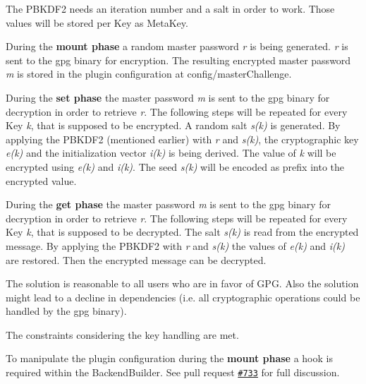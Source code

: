 The P\+B\+K\+D\+F2 needs an iteration number and a salt in order to work. Those values will be stored per Key as Meta\+Key.

During the {\bfseries mount phase} a random master password {\itshape r} is being generated. {\itshape r} is sent to the gpg binary for encryption. The resulting encrypted master password {\itshape m} is stored in the plugin configuration at {\ttfamily config/master\+Challenge}.

During the {\bfseries set phase} the master password {\itshape m} is sent to the gpg binary for decryption in order to retrieve {\itshape r}. The following steps will be repeated for every Key {\itshape k}, that is supposed to be encrypted. A random salt {\itshape s(k)} is generated. By applying the P\+B\+K\+D\+F2 (mentioned earlier) with {\itshape r} and {\itshape s(k)}, the cryptographic key {\itshape e(k)} and the initialization vector {\itshape i(k)} is being derived. The value of {\itshape k} will be encrypted using {\itshape e(k)} and {\itshape i(k)}. The seed {\itshape s(k)} will be encoded as prefix into the encrypted value.

During the {\bfseries get phase} the master password {\itshape m} is sent to the gpg binary for decryption in order to retrieve {\itshape r}. The following steps will be repeated for every Key {\itshape k}, that is supposed to be decrypted. The salt {\itshape s(k)} is read from the encrypted message. By applying the P\+B\+K\+D\+F2 with {\itshape r} and {\itshape s(k)} the values of {\itshape e(k)} and {\itshape i(k)} are restored. Then the encrypted message can be decrypted.

The solution is reasonable to all users who are in favor of G\+PG. Also the solution might lead to a decline in dependencies (i.\+e. all cryptographic operations could be handled by the gpg binary).

The constraints considering the key handling are met.

To manipulate the plugin configuration during the {\bfseries mount phase} a hook is required within the {\ttfamily Backend\+Builder}. See pull request \href{https://github.com/ElektraInitiative/libelektra/pull/733}{\tt \#733} for full discussion.